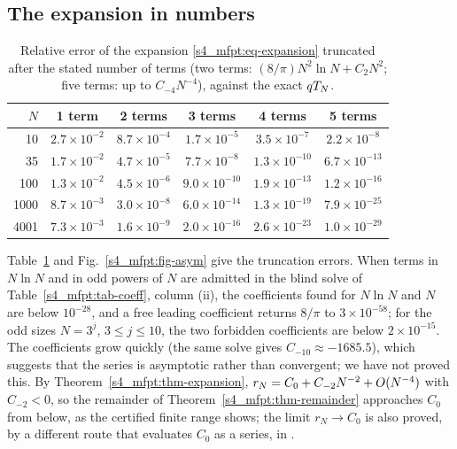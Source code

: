 \subsection{The expansion in numbers}

\begin{table}[htb]
\centering\small
\caption{Relative error of the expansion \eqref{s4_mfpt:eq-expansion} truncated after the stated number of
terms (two terms: $(8/\pi)N^{2}\ln N+C_{2}N^{2}$; five terms: up to $C_{-4}N^{-4}$), against the exact $qT_{N}$.}
\label{s4_mfpt:tab-trunc}
\begin{tabular}{@{}rccccc@{}}
\toprule
$N$ & 1 term & 2 terms & 3 terms & 4 terms & 5 terms\\
\midrule
10   & $2.7\times10^{-2}$ & $8.7\times10^{-4}$ & $1.7\times10^{-5}$  & $3.5\times10^{-7}$  & $2.2\times10^{-8}$ \\
35   & $1.7\times10^{-2}$ & $4.7\times10^{-5}$ & $7.7\times10^{-8}$  & $1.3\times10^{-10}$ & $6.7\times10^{-13}$\\
100  & $1.3\times10^{-2}$ & $4.5\times10^{-6}$ & $9.0\times10^{-10}$ & $1.9\times10^{-13}$ & $1.2\times10^{-16}$\\
1000 & $8.7\times10^{-3}$ & $3.0\times10^{-8}$ & $6.0\times10^{-14}$ & $1.3\times10^{-19}$ & $7.9\times10^{-25}$\\
4001 & $7.3\times10^{-3}$ & $1.6\times10^{-9}$ & $2.0\times10^{-16}$ & $2.6\times10^{-23}$ & $1.0\times10^{-29}$\\
\bottomrule
\end{tabular}
\end{table}

Table~\ref{s4_mfpt:tab-trunc} and Fig.~\ref{s4_mfpt:fig-asym} give the truncation errors. When terms in $N\ln N$ and in
odd powers of $N$ are admitted in the blind solve of Table~\ref{s4_mfpt:tab-coeff}, column (ii), the coefficients
found for $N\ln N$ and $N$ are below $10^{-28}$, and a free leading coefficient returns $8/\pi$ to $3\times10^{-58}$; for
the odd sizes $N=3^{j}$, $3\le j\le10$, the two forbidden coefficients are below $2\times10^{-15}$.
The coefficients grow quickly (the same solve gives $C_{-10}\approx-1685.5$), which suggests that the series is
asymptotic rather than convergent; we have not proved this.
By Theorem~\ref{s4_mfpt:thm-expansion}, $r_N=C_{0}+C_{-2}N^{-2}+O(N^{-4})$ with $C_{-2}<0$, so the remainder of
Theorem~\ref{s4_mfpt:thm-remainder} approaches $C_{0}$ from below, as the certified finite range shows; the limit
$r_N\to C_{0}$ is also proved, by a different route that evaluates $C_0$ as a series, in .

